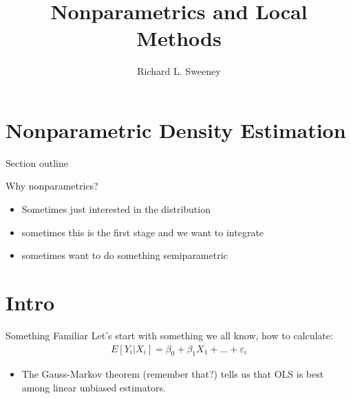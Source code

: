 

\title [Nonparametrics]{Nonparametrics and Local Methods}
\author{Richard L. Sweeney}



\begin{frame}
\titlepage
\end{frame}

\begin{frame}
  \tableofcontents  
\end{frame}



\section[Nonparametrics]{Nonparametric Density Estimation}

\begin{frame}{Section outline}

Why nonparametrics?
\begin{itemize}
  \item Sometimes just interested in the distribution %
  \item sometimes this is the first stage and we want to integrate
  \item sometimes want to do something semiparametric  
\end{itemize}

\end{frame}


\section{Intro}
\begin{frame}{Something Familiar}
Let's start with something we all know, how to calculate:
\begin{eqnarray*}
E[Y_i | X_i ] = \beta_0 + \beta_1 X_1 + \ldots + \varepsilon_i
\end{eqnarray*}
\begin{itemize}
\item The Gauss-Markov theorem (remember that?) tells us that OLS is best among linear unbiased estimators.
\end{itemize}
\end{frame}

